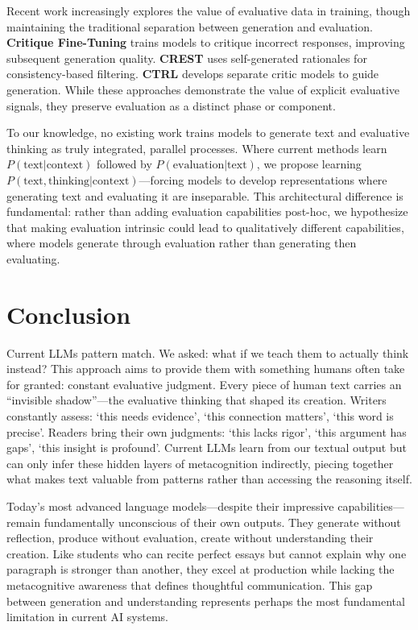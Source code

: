 \documentclass[11pt]{article}
\begin{document}
	Recent work increasingly explores the value of evaluative data in training, though maintaining the traditional separation between generation and evaluation. \textbf{Critique Fine-Tuning} \cite{wang2025critiquefinetuninglearningcritique} trains models to critique incorrect responses, improving subsequent generation quality. \textbf{CREST} \cite{lee2025selftrainingmeetsconsistencyimproving} uses self-generated rationales for consistency-based filtering. \textbf{CTRL} \cite{xie2025teachinglanguagemodelscritique} develops separate critic models to guide generation. While these approaches demonstrate the value of explicit evaluative signals, they preserve evaluation as a distinct phase or component.
	
	To our knowledge, no existing work trains models to generate text and evaluative thinking as truly integrated, parallel processes. Where current methods learn $P(\text{text}|\text{context})$ followed by $P(\text{evaluation}|\text{text})$, we propose learning $P(\text{text}, \text{thinking}|\text{context})$---forcing models to develop representations where generating text and evaluating it are inseparable. This architectural difference is fundamental: rather than adding evaluation capabilities post-hoc, we hypothesize that making evaluation intrinsic could lead to qualitatively different capabilities, where models generate through evaluation rather than generating then evaluating.
	
	\section{Conclusion}
	
	Current LLMs pattern match. We asked: what if we teach them to actually think instead? This approach aims to provide them with something humans often take for granted: constant evaluative judgment. Every piece of human text carries an ``invisible shadow''---the evaluative thinking that shaped its creation. Writers constantly assess: `this needs evidence', `this connection matters', `this word is precise'. Readers bring their own judgments: `this lacks rigor', `this argument has gaps', `this insight is profound'. Current LLMs learn from our textual output but can only infer these hidden layers of metacognition indirectly, piecing together what makes text valuable from patterns rather than accessing the reasoning itself.
	
	Today's most advanced language models---despite their impressive capabilities---remain fundamentally unconscious of their own outputs. They generate without reflection, produce without evaluation, create without understanding their creation. Like students who can recite perfect essays but cannot explain why one paragraph is stronger than another, they excel at production while lacking the metacognitive awareness that defines thoughtful communication. This gap between generation and understanding represents perhaps the most fundamental limitation in current AI systems.
	
\end{document}
